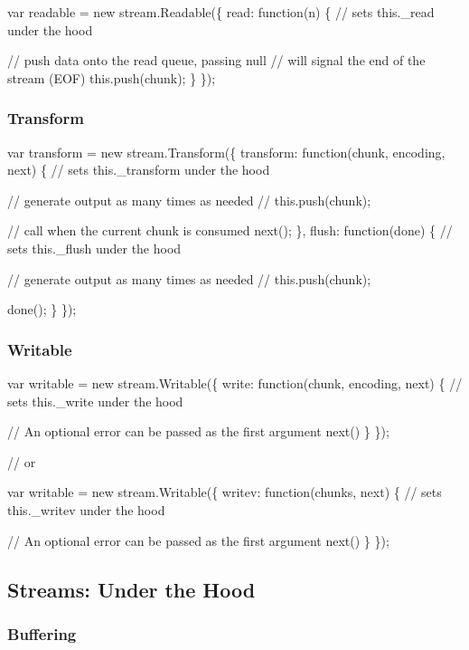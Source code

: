 \begin{DoxyCode}
var readable = new stream.Readable(\{
  read: function(n) \{
    // sets this.\_read under the hood

    // push data onto the read queue, passing null
    // will signal the end of the stream (EOF)
    this.push(chunk);
  \}
\});
\end{DoxyCode}


\subsubsection*{Transform}


\begin{DoxyCode}
var transform = new stream.Transform(\{
  transform: function(chunk, encoding, next) \{
    // sets this.\_transform under the hood

    // generate output as many times as needed
    // this.push(chunk);

    // call when the current chunk is consumed
    next();
  \},
  flush: function(done) \{
    // sets this.\_flush under the hood

    // generate output as many times as needed
    // this.push(chunk);

    done();
  \}
\});
\end{DoxyCode}


\subsubsection*{Writable}


\begin{DoxyCode}
var writable = new stream.Writable(\{
  write: function(chunk, encoding, next) \{
    // sets this.\_write under the hood

    // An optional error can be passed as the first argument
    next()
  \}
\});

// or

var writable = new stream.Writable(\{
  writev: function(chunks, next) \{
    // sets this.\_writev under the hood

    // An optional error can be passed as the first argument
    next()
  \}
\});
\end{DoxyCode}


\subsection*{Streams\+: Under the Hood}

\subsubsection*{Buffering}

